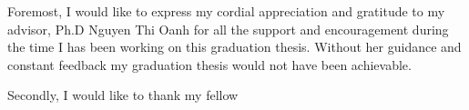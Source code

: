 \begin{acknowledgement}
\hspace{0.5cm}Foremost, I would like to express my cordial appreciation and gratitude to my advisor, Ph.D Nguyen Thi Oanh for all the support and encouragement during the time I has been working on this graduation thesis. Without her guidance and constant feedback my graduation thesis would not have been
achievable.\par
Secondly, I would like to thank my fellow 



\end{acknowledgement}